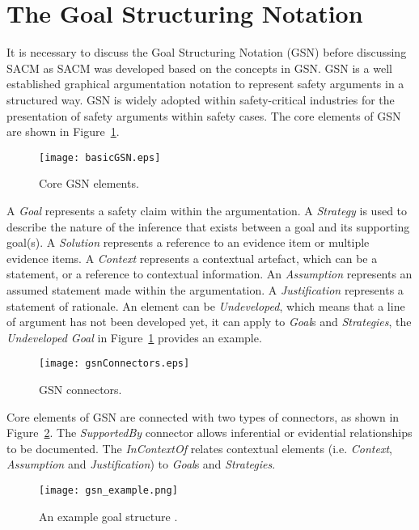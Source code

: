 \section{The Goal Structuring Notation}
\label{sec:gsn}
It is necessary to discuss the Goal Structuring Notation (GSN) before discussing SACM as SACM was developed based on the concepts in GSN. 
GSN is a well established graphical argumentation notation to represent safety arguments in a structured way. 
GSN is widely adopted within safety-critical industries for the presentation of safety arguments within safety cases. 
The core elements of GSN are shown in Figure~\ref{fig:gsnCore}.

\begin{figure}
	\centering
	\texttt{[image: basicGSN.eps]}
	\caption{Core GSN elements.}
	\label{fig:gsnCore}
\end{figure}

A \textit{Goal} represents a safety claim within the argumentation. 
A \textit{Strategy} is used to describe the nature of the inference that exists between a goal and its supporting goal(s). 
A \textit{Solution} represents a reference to an evidence item or multiple evidence items. 
A \textit{Context} represents a contextual artefact, which can be a statement, or a reference to contextual information. 
An \textit{Assumption} represents an assumed statement made within the argumentation. 
A \textit{Justification} represents a statement of rationale. 
An element can be \textit{Undeveloped}, which means that a line of argument has not been developed yet, it can apply to \textit{Goal}s and \textit{Strategies}, the \textit{Undeveloped Goal} in Figure~\ref{fig:gsnCore} provides an example. 

\begin{figure}
	\centering
	\texttt{[image: gsnConnectors.eps]}
	\caption{GSN connectors.}
	\label{fig:gsnEdges}
\end{figure}

Core elements of GSN are connected with two types of connectors, as shown in Figure~\ref{fig:gsnEdges}. 
The \textit{SupportedBy} connector allows inferential or evidential relationships to be documented. 
The \textit{InContextOf} relates contextual elements (i.e. \textit{Context}, \textit{Assumption} and \textit{Justification}) to \textit{Goal}s and \textit{Strategies}.
\begin{figure}
	\centering
	\texttt{[image: gsn\_example.png]}
	\caption{An example goal structure \cite{gsn2010draft}.}
	\label{fig:goalStructure}
\end{figure}

